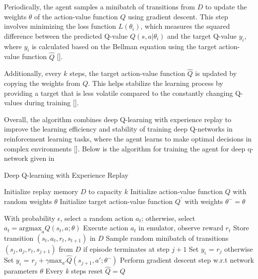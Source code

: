 \documentclass[12pt]{article}
\begin{document}
Periodically, the agent samples a minibatch of transitions from $D$ to update the weights $\theta$ of the action-value function $Q$ using gradient descent. This step involves minimizing the loss function $L(\theta_i)$, which measures the squared difference between the predicted Q-value $Q(s, a|\theta_i)$ and the target Q-value $y_i$, where $y_i$ is calculated based on the Bellman equation using the target action-value function $\hat{Q}$ [\cite{mnih}]. 

Additionally, every $k$ steps, the target action-value function $\hat{Q}$ is updated by copying the weights from $Q$. This helps stabilize the learning process by providing a target that is less volatile compared to the constantly changing Q-values during training [\cite{mnih}].

Overall, the algorithm combines deep Q-learning with experience replay to improve the learning efficiency and stability of training deep Q-networks in reinforcement learning tasks, where the agent learns to make optimal decisions in complex environments [\cite{mnih}].
\newpage
Below is the algorithm for training the agent for deep q-network given in \cite{mnih}

\begin{algorithm}
\caption{Deep Q-learning with Experience Replay}
\label{alg:dqn_experience_replay}
\begin{algorithmic}[1]
\State Initialize replay memory $D$ to capacity $k$
\State Initialize action-value function $Q$ with random weights $\theta$
\State Initialize target action-value function $Q^{\prime}$ with weights $\theta^- = \theta$
    
        \State With probability $\epsilon$, select a random action $a_t$; \State otherwise, select $a_t = \text{argmax}_a Q(s_t, a; \theta)$
        \State Execute action $a_t$ in emulator, observe reward $r_t$
        \State Store transition $(s_t, a_t, r_t, s_{t+1})$ in $D$ 
        \State Sample random minibatch of transitions $(s_j, a_j, r_t, s_{j+1})$ from $D$ 
        \State if episode terminates at step $j + 1$
        \State \hspace{\algorithmicindent} Set $y_i$ = $r_j$
        \State \hspace{\algorithmicindent} otherwise Set $y_i$ = $r_j + \gamma\text{max}_{a'}\hat{Q}(s_{j+1},a';\theta^-)$
        \State Perform gradient descent step w.r.t network parameters $\theta$
        \State Every \textit{k} steps reset $\hat{Q} = Q$
    \EndFor
\EndFor
\end{algorithmic}
\end{algorithm}
\end{document}
